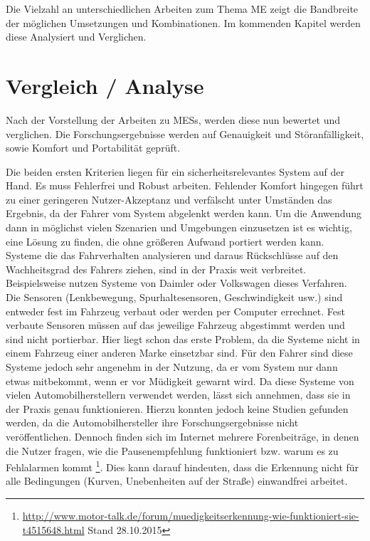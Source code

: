 {Die Vielzahl an unterschiedlichen Arbeiten zum Thema \acl{ME} zeigt die Bandbreite der möglichen Umsetzungen und Kombinationen. Im kommenden Kapitel werden diese Analysiert und Verglichen.

\section{Vergleich / Analyse}
\label{chap:an}
Nach der Vorstellung der Arbeiten zu \acl{MESs}, werden diese nun bewertet und verglichen. Die Forschungsergebnisse werden auf Genauigkeit und Störanfälligkeit, sowie Komfort und Portabilität geprüft. 

Die beiden ersten Kriterien liegen für ein sicherheitsrelevantes System auf der Hand. Es muss Fehlerfrei und Robust arbeiten. Fehlender Komfort hingegen führt zu einer geringeren Nutzer-Akzeptanz und verfälscht unter Umständen das Ergebnis, da der Fahrer vom System abgelenkt werden kann. Um die Anwendung dann in möglichst vielen Szenarien und Umgebungen einzusetzen  ist es wichtig, eine Lösung zu finden, die ohne größeren Aufwand portiert werden kann. \\

Systeme die das Fahrverhalten analysieren und daraus Rückschlüsse auf den Wachheitsgrad des Fahrers ziehen, sind in der Praxis weit verbreitet. Beispielsweise nutzen Systeme von Daimler \cite{Daimler} oder Volkswagen \cite{Bosch} dieses Verfahren. Die Sensoren (Lenkbewegung, Spurhaltesensoren, Geschwindigkeit usw.) sind entweder fest im Fahrzeug verbaut oder werden per Computer errechnet. Fest verbaute Sensoren müssen auf das jeweilige Fahrzeug abgestimmt werden und sind nicht portierbar. Hier liegt schon das erste Problem, da die Systeme nicht in einem Fahrzeug einer anderen Marke einsetzbar sind. Für den Fahrer sind diese Systeme jedoch sehr angenehm in der Nutzung, da er vom System nur dann etwas mitbekommt, wenn er vor Müdigkeit gewarnt wird. Da diese Systeme von vielen Automobilherstellern verwendet werden, lässt sich annehmen, dass sie in der Praxis genau funktionieren. Hierzu konnten jedoch keine Studien gefunden werden, da die Automobilhersteller ihre Forschungsergebnisse nicht veröffentlichen. Dennoch finden sich im Internet mehrere Forenbeiträge, in denen die Nutzer fragen, wie die Pausenempfehlung funktioniert bzw. warum es zu Fehlalarmen kommt \footnote{\url{http://www.motor-talk.de/forum/muedigkeitserkennung-wie-funktioniert-sie-t4515648.html} Stand 28.10.2015}. Dies kann darauf hindeuten, dass die Erkennung nicht für alle Bedingungen (Kurven, Unebenheiten auf der Straße) einwandfrei arbeitet. \\

}
